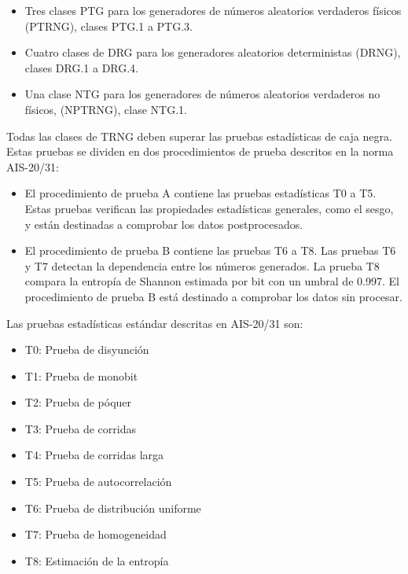             \begin{itemize}[noitemsep]
                \item Tres clases PTG para los generadores de números aleatorios verdaderos físicos (PTRNG), clases PTG.1 a PTG.3.
                \item Cuatro clases de DRG para los generadores aleatorios deterministas (DRNG), clases DRG.1 a DRG.4.
                \item Una clase NTG para los generadores de números aleatorios verdaderos no físicos, (NPTRNG), clase NTG.1.
            \end{itemize}
            
            Todas las clases de TRNG deben superar las pruebas estadísticas de caja negra. Estas pruebas se dividen en dos procedimientos de prueba descritos en la norma AIS-20/31:

            \begin{itemize}[noitemsep]
                \item El procedimiento de prueba A contiene las pruebas estadísticas T0 a T5. Estas pruebas verifican las propiedades estadísticas generales, como el sesgo, y están destinadas a comprobar los datos postprocesados.
                \item El procedimiento de prueba B contiene las pruebas T6 a T8. Las pruebas T6 y T7 detectan la dependencia entre los números generados. La prueba T8 compara la entropía de Shannon estimada por bit con un umbral de 0.997. El procedimiento de prueba B está destinado a comprobar los datos sin procesar.
            \end{itemize}		

           Las pruebas estadísticas estándar descritas en AIS-20/31 son:

            \begin{itemize}[noitemsep]
                \item T0: Prueba de disyunción
                \item T1: Prueba de monobit  
                \item T2: Prueba de póquer
                \item T3: Prueba de corridas
                \item T4: Prueba de corridas larga
                \item T5: Prueba de autocorrelación
                \item T6: Prueba de distribución uniforme
                \item T7: Prueba de homogeneidad
                \item T8: Estimación de la entropía
            \end{itemize}
        
